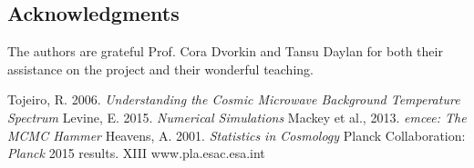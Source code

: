 \documentclass[aps,prd,final,twocolumn]{revtex4}
\begin{document}
\subsection*{Acknowledgments}
 
The authors are grateful Prof. Cora Dvorkin and Tansu Daylan for both their assistance on the project and their wonderful teaching.

 


\begin{thebibliography}{9}
 Tojeiro, R. 2006. \textit{Understanding the Cosmic Microwave Background Temperature Spectrum}
 Levine, E. 2015. \textit{Numerical Simulations}
 Mackey et al., 2013. \textit{emcee: The MCMC Hammer}
 Heavens, A. 2001. \textit{Statistics in Cosmology}
 Planck Collaboration: \textit{Planck} 2015 results. XIII
 www.pla.esac.esa.int
\end{thebibliography}
\end{document}
